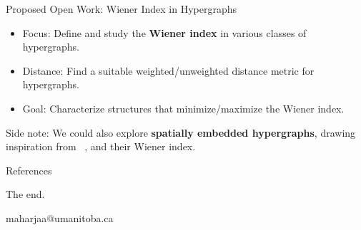 \documentclass[11pt]{beamer}
\makeatletter
\newcommand{\email}{maharjaa@umanitoba.ca}
\makeatother
\begin{document}
\begin{frame}{Proposed Open Work: Wiener Index in Hypergraphs}
	\begin{itemize}
		\pause
		\item Focus: Define and study the \textbf{Wiener index} in various classes of hypergraphs.
		      \pause
		\item Distance: Find a suitable weighted/unweighted distance metric for hypergraphs.
		      \pause
		\item Goal: Characterize structures that minimize/maximize the Wiener index.
	\end{itemize}

	\pause
	Side note: We could also explore \textbf{spatially embedded hypergraphs}, drawing inspiration from ~\cite{article:geometric_spanning_trees_minimizing_wiener_index}, and their Wiener index.
\end{frame}

\begin{frame}[allowframebreaks]{References}
	
\end{frame}

\begin{frame}

	\begin{center}
		The end.

		\email
	\end{center}

	\begin{figure}[htb]
		\centering
	\end{figure}

\end{frame}
\end{document}
